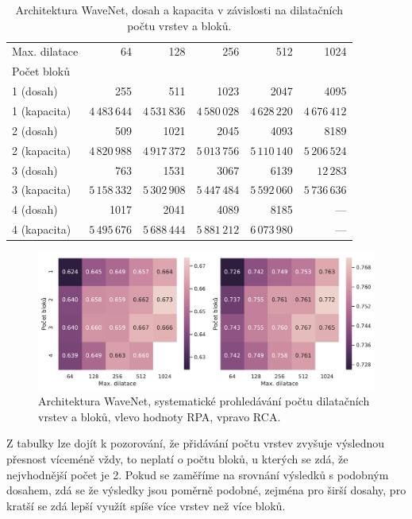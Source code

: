 \begin{table}[h!]
\centering
    \begin{tabular}{lrrrrr}
    \toprule
    Max. dilatace & 64 & 128 & 256 & 512 & 1024 \\
    Počet bloků   & {} & {}  & {}  & {}  & {}  \\
    \midrule
    1 (dosah) & 255  & 511  & 1023 & 2047 & 4095 \\
    1 (kapacita) & $4\,483\,644$  & $4\,531\,836$ & $4\,580\,028$ & $4\,628\,220$ & $4\,676\,412$ \\
    2 (dosah) & 509  & 1021 & 2045 & 4093 & 8189 \\
    2 (kapacita) & $4\,820\,988$  & $4\,917\,372$ & $5\,013\,756$ & $5\,110\,140$ & $5\,206\,524$ \\
    3 (dosah) & 763  & 1531 & 3067 & 6139 & $12\,283$ \\
    3 (kapacita) & $5\,158\,332$  & $5\,302\,908$ & $5\,447\,484$ & $5\,592\,060$ & $5\,736\,636$ \\
    4 (dosah) & 1017 & 2041 & 4089 & 8185 & --- \\
    4 (kapacita) & $5\,495\,676$  & $5\,688\,444$ & $5\,881\,212$ & $6\,073\,980$ & --- \\
    \bottomrule
    \end{tabular}
\caption{Architektura WaveNet, dosah a kapacita v závislosti na dilatačních počtu vrstev a bloků.}\label{tab:wavenet_dilation_width_numbers}
\end{table}

\begin{figure}[h]\centering
    \includegraphics[scale=0.5]{../img/figures/wavenet_stacks_gridsearch.pdf}
\caption{Architektura WaveNet, systematické prohledávání počtu dilatačních vrstev a bloků, vlevo hodnoty RPA, vpravo RCA.}\label{obr:wavenet_stacks_gridsearch}
\end{figure}

Z tabulky lze dojít k pozorování, že přidávání počtu vrstev zvyšuje výslednou přesnost víceméně vždy, to neplatí o počtu bloků, u kterých se zdá, že nejvhodnější počet je 2. Pokud se zaměříme na srovnání výsledků s podobným dosahem, zdá se že výsledky jsou poměrně podobné, zejména pro širší dosahy, pro kratší se zdá lepší využít spíše více vrstev než více bloků.

